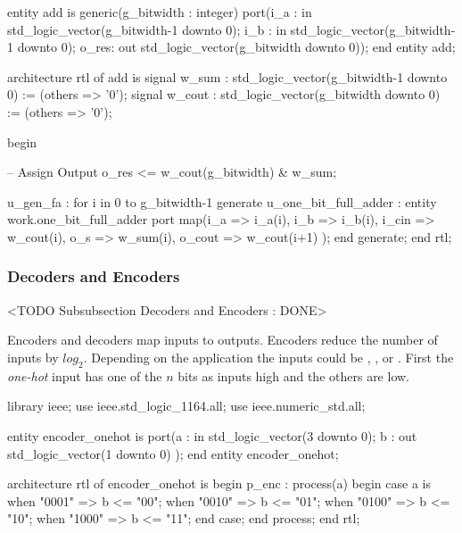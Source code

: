 \begin{VHDLlisting}[tabsize=4]
entity add is
generic(g_bitwidth : integer)
port(i_a  : in    std_logic_vector(g_bitwidth-1 downto 0);  
     i_b  : in    std_logic_vector(g_bitwidth-1 downto 0);  
	 o_res:   out std_logic_vector(g_bitwidth downto 0));
end entity add;

architecture rtl of add is 
	signal w_sum  : std_logic_vector(g_bitwidth-1 downto 0) := (others => '0'); 
	signal w_cout : std_logic_vector(g_bitwidth downto 0) := (others => '0');
	
begin 

	-- Assign Output 
	o_res <= w_cout(g_bitwidth) & w_sum; 
	
	u_gen_fa : for i in 0 to g_bitwidth-1 generate  
		u_one_bit_full_adder : entity work.one_bit_full_adder  
		port map(i_a    => i_a(i),
				 i_b    => i_b(i),
				 i_cin  => w_cout(i),
				 o_s    => w_sum(i),
				 o_cout => w_cout(i+1)
        );  
	end generate;
end rtl;
\end{VHDLlisting}


	
\subsubsection{Decoders and Encoders}
	<TODO Subsubsection  Decoders and Encoders : DONE>
	
Encoders and decoders map inputs to outputs. Encoders reduce the number of inputs by $log_2$. Depending on the application the inputs could be \emph{}, \emph{}, or \emph{}. First the \emph{one-hot} input has one of the $n$ bits as inputs high and the others are low.

\begin{VHDLlisting}[tabsize=4]
library ieee;
  use ieee.std_logic_1164.all;
  use ieee.numeric_std.all;
  
entity encoder_onehot is
port(a : in    std_logic_vector(3 downto 0);
     b :   out std_logic_vector(1 downto 0)
);
end entity encoder_onehot;

architecture rtl of encoder_onehot is
begin
    p_enc : process(a)
    begin
        case a is	
            when "0001" => 
                b <= "00";
            when "0010" => 
                b <= "01";
            when "0100" => 
                b <= "10";
            when "1000" => 
                b <= "11";
        end case;
    end process;
end rtl;
\end{VHDLlisting}


